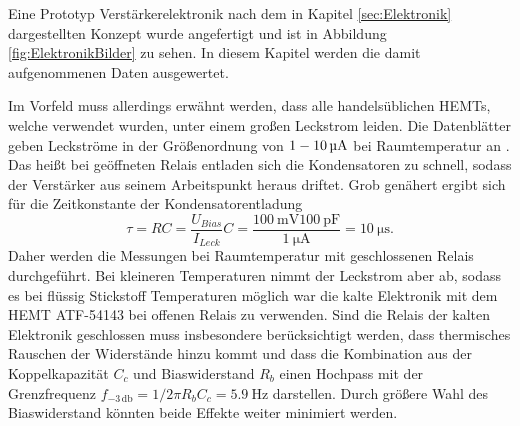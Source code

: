 Eine Prototyp Verstärkerelektronik nach dem in Kapitel \ref{sec:Elektronik} dargestellten Konzept wurde angefertigt und ist in Abbildung \ref{fig:ElektronikBilder} zu sehen.
In diesem Kapitel werden die damit aufgenommenen Daten ausgewertet.

Im Vorfeld muss allerdings erwähnt werden, dass alle handelsüblichen HEMTs, welche verwendet wurden, unter einem großen Leckstrom leiden.
Die Datenblätter geben Leckströme in der Größenordnung von $\SI{1}{} \-- \SI{10}{\micro\ampere}$ bei Raumtemperatur an \cite{ATF-54143, ATF-33143, ATF-34143}.
Das heißt bei geöffneten Relais entladen sich die Kondensatoren zu schnell, sodass der Verstärker aus seinem Arbeitspunkt heraus driftet.
Grob genähert ergibt sich für die Zeitkonstante der Kondensatorentladung
\begin{equation}
\tau = RC =  \frac{U_{Bias}}{I_{Leck}}C  = \frac{\SI{100}{\milli\volt}\SI{100}{\pico\farad}}{\SI{1}{\micro\ampere}} = \SI{10}{\micro\second}.
\end{equation}
Daher werden die Messungen bei Raumtemperatur mit geschlossenen Relais durchgeführt.
Bei kleineren Temperaturen nimmt der Leckstrom aber ab, sodass es bei flüssig Stickstoff Temperaturen möglich war die kalte Elektronik mit dem HEMT ATF-54143 bei offenen Relais zu verwenden.
Sind die Relais der kalten Elektronik geschlossen muss insbesondere berücksichtigt werden, dass thermisches Rauschen der Widerstände hinzu kommt und dass die Kombination aus der Koppelkapazität $C_c$ und Biaswiderstand $R_b$ einen Hochpass mit der Grenzfrequenz $f_{-3\,\mathrm{db}}=1/2\pi R_bC_c=\SI{5.9}{\hertz}$ darstellen.
Durch größere Wahl des Biaswiderstand könnten beide Effekte weiter minimiert werden.

